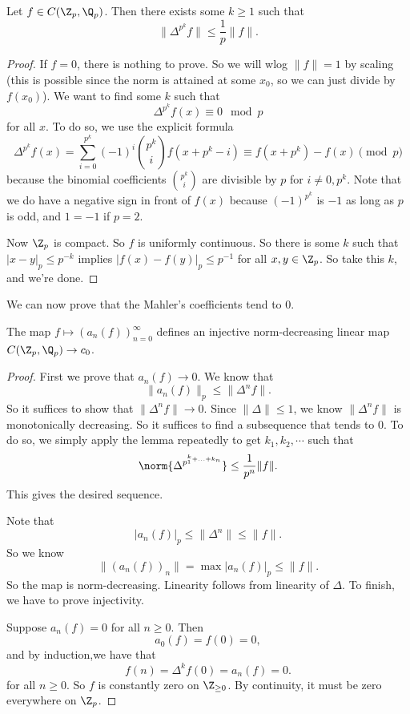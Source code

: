 \documentclass[a4paper]{article}
\begin{document}
\begin{lemma}
  Let $f \in C(\Z_p, \Q_p)$. Then there exists some $k\geq 1$ such that
  \[
    \|\Delta^{p^k}f\| \leq \frac{1}{p} \|f\|.
  \]
\end{lemma}

\begin{proof}
  If $f =0 $, there is nothing to prove. So we will wlog $\|f\| = 1$ by scaling (this is possible since the norm is attained at some $x_0$, so we can just divide by $f(x_0)$). We want to find some $k$ such that
  \[
    \Delta^{p^k}f(x) \equiv 0 \mod p
  \]
  for all $x$. To do so, we use the explicit formula
  \[
    \Delta^{p^k} f(x) = \sum_{i = 0}^{p^k} (-1)^i \binom{p^k}{i} f(x + p^k - i) \equiv f(x + p^k) - f(x)\pmod p
  \]
  because the binomial coefficients $\binom{p^k}{i}$ are divisible by $p$ for $i \not= 0, p^k$. Note that we do have a negative sign in front of $f(x)$ because $(-1)^{p^k}$ is $-1$ as long as $p$ is odd, and $1 = -1$ if $p = 2$.

  Now $\Z_p$ is compact. So $f$ is uniformly continuous. So there is some $k$ such that $|x - y|_p \leq p^{-k}$ implies $|f(x) - f(y)|_p \leq p^{-1}$ for all $x, y \in \Z_p$. So take this $k$, and we're done.
\end{proof}

We can now prove that the Mahler's coefficients tend to $0$.

\begin{prop}
  The map $f \mapsto (a_n(f))_{n = 0}^\infty$ defines an injective norm-decreasing linear map $C(\Z_p, \Q_p) \to c_0$.
\end{prop}

\begin{proof}
  First we prove that $a_n(f) \to 0$. We know that
  \[
    \|a_n(f)\|_p \leq \|\Delta^n f\|.
  \]
  So it suffices to show that $\|\Delta^n f\| \to 0$. Since $\|\Delta\| \leq 1$, we know $\|\Delta^n f\|$ is monotonically decreasing. So it suffices to find a subsequence that tends to $0$. To do so, we simply apply the lemma repeatedly to get $k_1, k_2, \cdots$ such that
  \[
    \norm{\Delta^{p^{^k_1 + \ldots + k_n}}} \leq \frac{1}{p^n}\|f\|.
  \]
  This gives the desired sequence.

  Note that
  \[
    |a_n(f)|_p \leq \|\Delta^n\| \leq \|f\|.
  \]
  So we know
  \[
    \|(a_n(f))_n\| = \max |a_n(f)|_p \leq \|f\|.
  \]
  So the map is norm-decreasing. Linearity follows from linearity of $\Delta$. To finish, we have to prove injectivity.

  Suppose $a_n(f) = 0$ for all $n \geq 0$. Then
  \[
    a_0(f) = f(0) = 0,
  \]
  and by induction,we have that
  \[
    f(n) = \Delta^k f(0) = a_n (f) = 0.
  \]
  for all $n \geq 0$. So $f$ is constantly zero on $\Z_{\geq 0}$. By continuity, it must be zero everywhere on $\Z_p$.
\end{proof}
\end{document}
